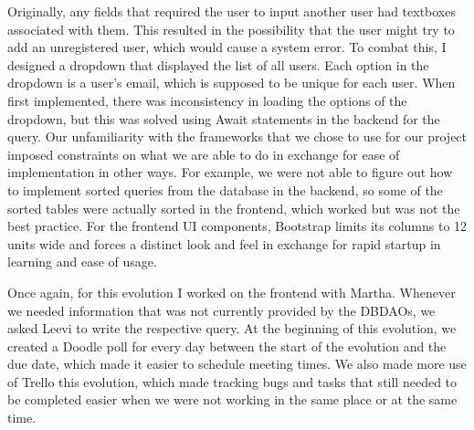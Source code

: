 \documentclass{article}
\begin{document}
	Originally, any fields that required the user to input another user had textboxes associated with them. This resulted in the possibility that the user might try to add an unregistered user, which would cause a system error. To combat this, I designed a dropdown that displayed the list of all users. Each option in the dropdown is a user’s email, which is supposed to be unique for each user. When first implemented, there was inconsistency in loading the options of the dropdown, but this was solved using Await statements in the backend for the query.                                                                     
	Our unfamiliarity with the frameworks that we chose to use for our project imposed constraints on what we are able to do in exchange for ease of implementation in other ways. For example, we were not able to figure out how to implement sorted queries from the database in the backend, so some of the sorted tables were actually sorted in the frontend, which worked but was not the best practice. For the frontend UI components, Bootstrap limits its columns to 12 units wide and forces a distinct look and feel in exchange for rapid startup in learning and ease of usage.
	
	Once again, for this evolution I worked on the frontend with Martha. Whenever we needed information that was not currently provided by the DBDAOs, we asked Leevi to write the respective query. At the beginning of this evolution, we created a Doodle poll for every day between the start of the evolution and the due date, which made it easier to schedule meeting times. We also made more use of Trello this evolution, which made tracking bugs and tasks that still needed to be completed easier when we were not working in the same place or at the same time.
\end{document}
